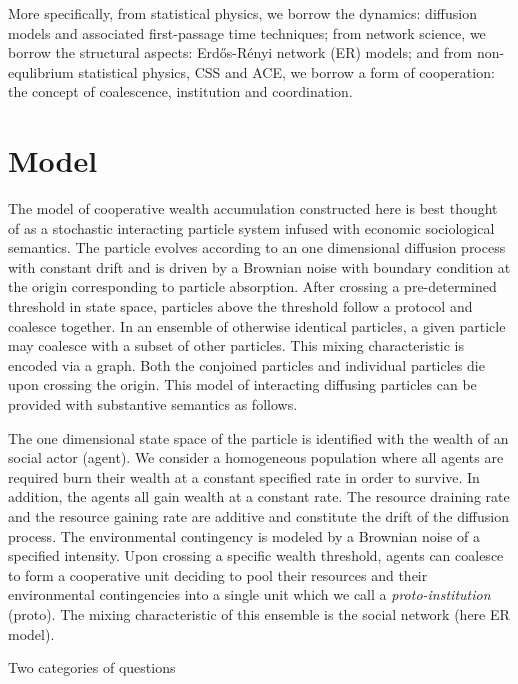 \documentclass[sigconf]{acmart}
\begin{document}
More specifically, from statistical physics, we borrow the dynamics: diffusion models and associated first-passage time techniques; from network science, we borrow the structural aspects: Erd\H{o}s-R\'{e}nyi network (ER) models; and from non-equlibrium statistical physics, CSS and ACE, we borrow a form of cooperation: the concept of coalescence, institution and coordination. 



\section{Model}
The model of cooperative wealth accumulation constructed here is best thought of as a stochastic interacting particle system infused with economic sociological semantics. The particle evolves according to an one dimensional diffusion process with constant drift and is driven by a Brownian noise with boundary condition at the origin corresponding to particle absorption. After crossing a pre-determined threshold in state space, particles above the threshold follow a protocol and coalesce together. In an ensemble of otherwise identical particles, a given particle may coalesce with a subset of other particles. This mixing characteristic is encoded via a graph. Both the conjoined particles and individual particles die upon crossing the origin. This model of interacting diffusing particles can be provided with substantive semantics as follows. 

The one dimensional state space of the particle is identified with the wealth of an social actor (agent). We consider a homogeneous population where all agents are required burn their wealth at a constant specified rate in order to survive. In addition, the agents all gain wealth at a constant rate. The resource draining rate and the resource gaining rate are additive and constitute the drift of the diffusion process. The environmental contingency is modeled by a Brownian noise of a specified intensity. Upon crossing a specific wealth threshold, agents can coalesce to form a cooperative unit deciding to pool their resources and their environmental contingencies into a single unit which we call a \textit{proto-institution} (proto). The mixing characteristic of this ensemble is the social network (here ER model).          

Two categories of questions 




~\cite{redner2001guide} ~\cite{rv}  ~\cite{wilhite} ~\cite{arthur} 
\end{document}
